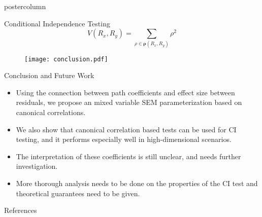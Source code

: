 \documentclass{beamer}
\begin{document}
\begin{frame}
\begin{columns}
\begin{column}{0.33\textwidth}
\begin{beamercolorbox}[center]{postercolumn}
\begin{minipage}{.98\textwidth}
{\begin{myblock}{Conditional Independence Testing}
		\begin{equation*}
			V(R_x, R_y) = \sum_{\rho \in \bm{\rho}(R_x, R_y)} \rho^2
		\end{equation*}

		\begin{figure}
			\texttt{[image: conclusion.pdf]}
		\end{figure}

	\end{myblock}\vfill
	\begin{myblock}{Conclusion and Future Work}
		\begin{itemize}
			\item Using the connection between path coefficients and effect size between residuals, we propose an mixed variable SEM parameterization based
				on canonical correlations.
			\item We also show that canonical correlation based tests can be used for CI testing, and it performs especially well in high-dimensional scenarios.
			\item The interpretation of these coefficients is still unclear, and needs further investigation.
			\item 

				More thorough analysis needs to be done on the properties of the CI test and theoretical guarantees need to be given.
		\end{itemize}
	\end{myblock}\vfill
	\begin{myblock}{References}
		\footnotesize
		
	\end{myblock}\vfill
		}\end{minipage}\end{beamercolorbox}
	\end{column}
\end{columns}
\end{frame}
\end{document}
